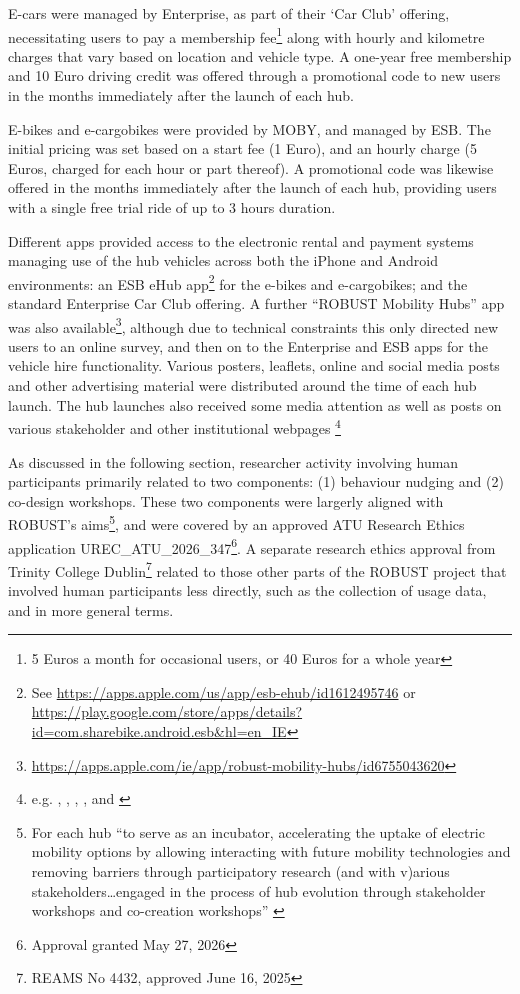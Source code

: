 \documentclass[preprint, 3p,
authoryear]{elsarticle} %
\begin{document}
E-cars were managed by Enterprise, as part of their `Car Club' offering,
necessitating users to pay a membership fee\footnote{5 Euros a month for
  occasional users, or 40 Euros for a whole year} along with hourly and
kilometre charges that vary based on location and vehicle type. A
one-year free membership and 10 Euro driving credit was offered through
a promotional code to new users in the months immediately after the
launch of each hub.

E-bikes and e-cargobikes were provided by MOBY, and managed by ESB. The
initial pricing was set based on a start fee (1 Euro), and an hourly
charge (5 Euros, charged for each hour or part thereof). A promotional
code was likewise offered in the months immediately after the launch of
each hub, providing users with a single free trial ride of up to 3 hours
duration.

Different apps provided access to the electronic rental and payment
systems managing use of the hub vehicles across both the iPhone and
Android environments: an ESB eHub app\footnote{See
  \url{https://apps.apple.com/us/app/esb-ehub/id1612495746} or
  \url{https://play.google.com/store/apps/details?id=com.sharebike.android.esb&hl=en_IE}}
for the e-bikes and e-cargobikes; and the standard Enterprise Car Club
offering. A further ``ROBUST Mobility Hubs'' app was also
available\footnote{\url{https://apps.apple.com/ie/app/robust-mobility-hubs/id6755043620}},
although due to technical constraints this only directed new users to an
online survey, and then on to the Enterprise and ESB apps for the
vehicle hire functionality. Various posters, leaflets, online and social
media posts and other advertising material were distributed around the
time of each hub launch. The hub launches also received some media
attention as well as posts on various stakeholder and other
institutional webpages \footnote{e.g.
  \citet{Atlantic-Technological-University:2025ab},
  \citet{Atlantic-Technological-University:2025aa},
  \citet{Waterford-City-and-County-Council:2025aa}, \citet{ESB:0aa}, and
  \citet{Kelleher:2025aa}}

As discussed in the following section, researcher activity involving
human participants primarily related to two components: (1) behaviour
nudging and (2) co-design workshops. These two components were largerly
aligned with ROBUST's aims\footnote{For each hub ``to serve as an
  incubator, accelerating the uptake of electric mobility options by
  allowing interacting with future mobility technologies and removing
  barriers through participatory research (and with v)arious
  stakeholders\ldots engaged in the process of hub evolution through
  stakeholder workshops and co-creation workshops''
  \citep{ROBUST:2025aa}}, and were covered by an approved ATU Research
Ethics application UREC\_ATU\_2026\_347\footnote{Approval granted May
  27, 2026}. A separate research ethics approval from Trinity College
Dublin\footnote{REAMS No 4432, approved June 16, 2025} related to those
other parts of the ROBUST project that involved human participants less
directly, such as the collection of usage data, and in more general
terms.
\end{document}
